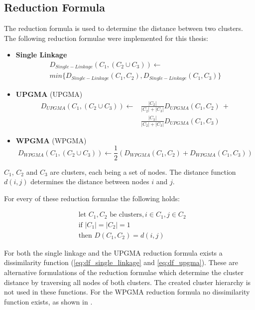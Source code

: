 \subsection{Reduction Formula}
The reduction formula is used to determine the distance between two clusters.
The following reduction formulae were implemented for this thesis:

\begin{itemize}
    \item \textbf{Single Linkage}
    \begin{multline}
    D_{Single-Linkage}(C_1, (C_2 \cup C_3)) \leftarrow \\
    min \{ D_{Single-Linkage}(C_1, C_2), D_{Single-Linkage}(C_1, C_3) \}
    \end{multline}
    \item \textbf{\acrshort{UPGMA}} (\acrlong{UPGMA})
    \begin{equation}
    \begin{split}
    D_{UPGMA}(C_1, (C_2 \cup C_3)) \leftarrow &\frac{|C_2|}{|C_2|+|C_3|}D_{UPGMA}(C_1, C_2)\ + \\ &\frac{|C_3|}{|C_2|+|C_3|}D_{UPGMA}(C_1, C_3)
    \end{split}
    \end{equation}
    \item \textbf{\acrshort{WPGMA}} (\acrlong{WPGMA})
    \begin{equation}
    D_{WPGMA}(C_1, (C_2 \cup C_3)) \leftarrow \frac{1}{2} (D_{WPGMA}(C_1, C_2) + D_{WPGMA}(C_1, C_3))
    \end{equation}
\end{itemize}

$C_1$, $C_2$ and $C_3$ are clusters, each being a set of nodes. The distance function $d(i, j)$ determines the distance between nodes $i$ and $j$.

For every of these reduction formulae the following holds:

\begin{equation}
\begin{split}
&\textrm{let }C_1, C_2\textrm{ be clusters}, i \in C_1, j \in C_2 \\
&\textrm{if }|C_1| = |C_2| = 1 \\
&\textrm{then }D(C_1, C_2) = d(i, j)
\end{split}
\end{equation}

For both the single linkage and the \acrshort{UPGMA} reduction formula exists a dissimilarity function (\ref{eq:df_single_linkage} and \ref{eq:df_upgma}). These are alternative formulations of the reduction formulae which determine the cluster distance by traversing all nodes of both clusters. The created cluster hierarchy is not used in these functions. For the \acrshort{WPGMA} reduction formula no dissimilarity function exists, as shown in \cite{clustering:2007}.

